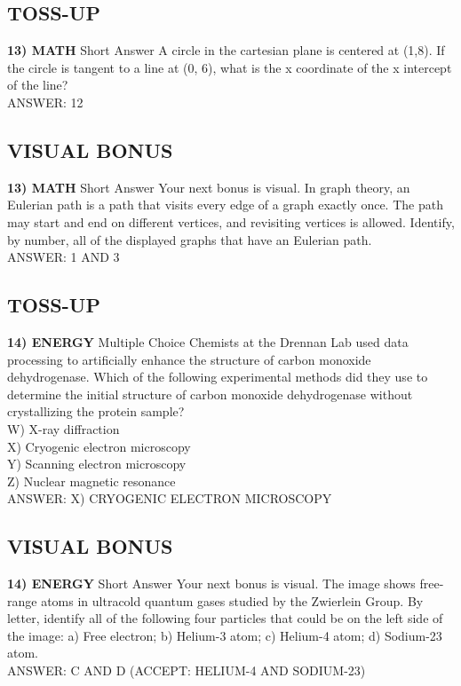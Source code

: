 \documentclass{article}
\begin{document}
\subsection*{TOSS-UP}
\textbf{13) MATH} Short Answer A circle in the cartesian plane is centered at (1,8). If the circle is tangent to a line at (0, 6), what is the x coordinate of the x intercept of the line?
\\ANSWER: 12

\subsection*{VISUAL BONUS}
\textbf{13) MATH} Short Answer Your next bonus is visual. In graph theory, an Eulerian path is a path that visits every edge of a graph exactly once. The path may start and end on different vertices, and revisiting vertices is allowed. Identify, by number, all of the displayed graphs that have an Eulerian path.
\\ANSWER: 1 AND 3

\subsection*{TOSS-UP}
\textbf{14) ENERGY} Multiple Choice Chemists at the Drennan Lab used data processing to artificially enhance the structure of carbon monoxide dehydrogenase. Which of the following experimental methods did they use to determine the initial structure of carbon monoxide dehydrogenase without crystallizing the protein sample?
\\W) X-ray diffraction
\\X) Cryogenic electron microscopy
\\Y) Scanning electron microscopy
\\Z) Nuclear magnetic resonance
\\ANSWER: X) CRYOGENIC ELECTRON MICROSCOPY

\subsection*{VISUAL BONUS}
\textbf{14) ENERGY} Short Answer Your next bonus is visual. The image shows free-range atoms in ultracold quantum gases studied by the Zwierlein Group. By letter, identify all of the following four particles that could be on the left side of the image: a) Free electron; b) Helium-3 atom; c) Helium-4 atom; d) Sodium-23 atom.
\\ANSWER: C AND D (ACCEPT: HELIUM-4 AND SODIUM-23)
\end{document}
